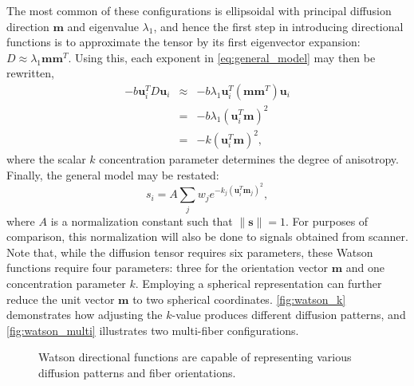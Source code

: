\documentclass[letterpaper,hyperref,12pt]{gatech-thesis}
\renewcommand{\v}[1]{\ensuremath{\mathbf #1}\xspace}
\newcommand{\s}{\v s}
\renewcommand{\u}{\v u}
\newcommand{\m}{\v m}
\newcommand{\norm}[1]{\ensuremath{\|#1\|}}
\begin{document}
The most common of these configurations is ellipsoidal with principal
diffusion direction $\m$ and eigenvalue $\lambda_1$, and hence the first step
in introducing directional functions is to approximate the tensor by its first
eigenvector expansion: $D \approx \lambda_1 \m \m^T$.  Using this, each
exponent in \autoref{eq:general_model} may then be rewritten,
\begin{eqnarray} \label{eq:approx}
  -b \u_i^T D \u_i
  &\approx& -b\lambda_1\u_i^T\left(\m\m^T\right)\u_i \\
  &=& -b \lambda_1 \left(\u_i^T \m\right)^2 \\
  &=& -k \left(\u_i^T \m\right)^2 ,
\end{eqnarray}
where the scalar $k$ concentration parameter determines the degree of
anisotropy.  Finally, the general model may be restated:
\begin{equation} \label{eq:watson_model}
  s_i = A \sum_j w_j e^{-k_j (\u_i^T \m_j)^2} ,
\end{equation}
where $A$ is a normalization constant such that $\norm{\s}=1$.  For purposes
of comparison, this normalization will also be done to signals obtained from
scanner.  Note that, while the diffusion tensor requires six parameters, these
Watson functions require four parameters: three for the orientation vector
$\m$ and one concentration parameter $k$.  Employing a spherical
representation can further reduce the unit vector \m to two spherical
coordinates.  \autoref{fig:watson_k} demonstrates how adjusting the $k$-value
produces different diffusion patterns, and \autoref{fig:watson_multi}
illustrates two multi-fiber configurations.
\begin{figure}[t]
  \centering
  \hspace{1em}%
  \caption{Watson directional functions are capable of representing various
    diffusion patterns and fiber orientations.}
  \label{fig:watson}
\end{figure}
\end{document}
